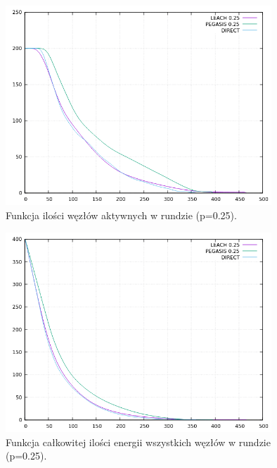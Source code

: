 \documentclass[a4paper,12pt,twoside,openany]{report}
\begin{document}
\begin{figure}[H]
 \centering
 \includegraphics[width=10cm]{images/gnuplot/test_4/nodes_in_round_p025.png}
 \caption{Funkcja ilości węzłów aktywnych w rundzie (p=0.25).}
\end{figure}

\begin{figure}[H]
 \centering
 \includegraphics[width=10cm]{images/gnuplot/test_4/energy_in_round_p025.png}
 \caption{Funkcja całkowitej ilości energii wszystkich węzłów w rundzie (p=0.25).}
\end{figure}
\end{document}
